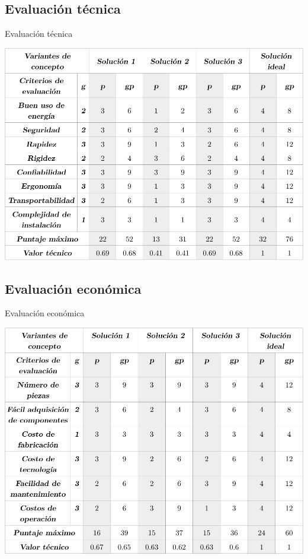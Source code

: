 \subsection{Evaluación técnica}
\begin{table}[htbp!]
  \centering
  \caption{Evaluación técnica}
  \label{diag:eval_tec}
  \includegraphics[width=0.8\linewidth]{eval_tec.pdf}
\end{table}

\newpage

\subsection{Evaluación económica}
\begin{table}[htbp!]
  \centering
  \caption{Evaluación económica}
  \label{diag:eval_econ}
  \includegraphics[width=0.8\linewidth]{eval_econ.pdf}
\end{table}

